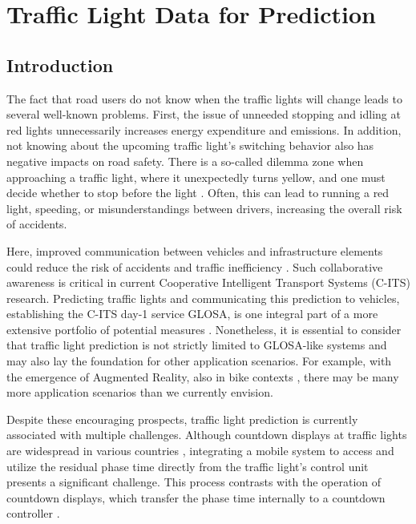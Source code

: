 \chapter{Traffic Light Data for Prediction}\label{ch:prediction}


\section{Introduction}

The fact that road users do not know when the traffic lights will change leads to several well-known problems. First, the issue of unneeded stopping and idling at red lights unnecessarily increases energy expenditure and emissions. In addition, not knowing about the upcoming traffic light's switching behavior also has negative impacts on road safety. There is a so-called dilemma zone when approaching a traffic light, where it unexpectedly turns yellow, and one must decide whether to stop before the light \cite{zhang_yellow_2014, suzuki_new_2018}. Often, this can lead to running a red light, speeding, or misunderstandings between drivers, increasing the overall risk of accidents.

Here, improved communication between vehicles and infrastructure elements could reduce the risk of accidents and traffic inefficiency \cite{sun_optimal_2020}. Such collaborative awareness is critical in current Cooperative Intelligent Transport Systems (C-ITS) research. Predicting traffic lights and communicating this prediction to vehicles, establishing the C-ITS day-1 service GLOSA, is one integral part of a more extensive portfolio of potential measures \cite{mellegard_day_2020}. Nonetheless, it is essential to consider that traffic light prediction is not strictly limited to GLOSA-like systems and may also lay the foundation for other application scenarios. For example, with the emergence of Augmented Reality, also in bike contexts \cite{matviienko_bikear_2022, kosch_notibike_2022}, there may be many more application scenarios than we currently envision.

Despite these encouraging prospects, traffic light prediction is currently associated with multiple challenges. Although countdown displays at traffic lights are widespread in various countries \cite{nygardhs_cyclists_2021}, integrating a mobile system to access and utilize the residual phase time directly from the traffic light's control unit presents a significant challenge. This process contrasts with the operation of countdown displays, which transfer the phase time internally to a countdown controller \cite{islam_improved_2016}.


